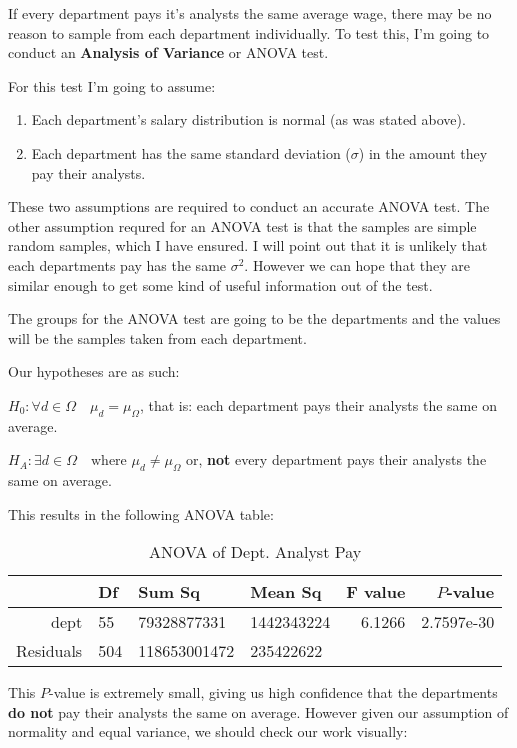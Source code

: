 \documentclass[letterpaper]{article}
\theoremstyle{definition}
\begin{document}
If every department pays it's analysts the same average wage, there may be no reason to
sample from each department individually. To test this, I'm going to conduct an
\textbf{Analysis of Variance} or ANOVA test. 

For this test I'm going to assume: 

\begin{enumerate}
	\item Each department's salary distribution is normal (as was stated above).
	\item Each department has the same standard deviation ($\sigma$) in the amount they
		pay their analysts.
\end{enumerate}

These two assumptions are required to conduct an accurate ANOVA test. The other assumption
requred for an ANOVA test is that the samples are simple random samples, which I have
ensured. I will point out that it is unlikely that each departments pay has the same
$\sigma^2$. However we can hope that they are similar enough to get some kind of useful
information out of the test.

The groups for the ANOVA test are going to be the departments and the values will be the
samples taken from each department. 

Our hypotheses are as such:

$\displaystyle{H_0:\forall d \in \Omega \quad  \mu_{d} = \mu_{\Omega}}$, that is: each department pays their analysts the same on average.

$\displaystyle{H_{A}: \exists  d \in \Omega \quad \text{where } \mu_{d} \neq
\mu_{\Omega}}$ or, \textbf{not} every department pays their analysts the same on average.

This results in the following ANOVA table:
    

\begin{table}[h]
	\centering
	\caption{ANOVA of Dept. Analyst Pay}
	\label{tab:1}
	\begin{tabular}{r|lllrr}
	& Df & Sum Sq & Mean Sq & F value & $P$-value\\
	\hline
		dept &  55 &  79328877331 & 1442343224 & 6.1266 & 2.7597e-30\\
		Residuals & 504 & 118653001472 &  235422622 &       &           \\
	\end{tabular}
\end{table}

This $P$-value is extremely small, giving us high confidence that the departments
\textbf{do not} pay their analysts the same on average. However given our assumption of
normality and equal variance, we should check our work visually:
\end{document}
